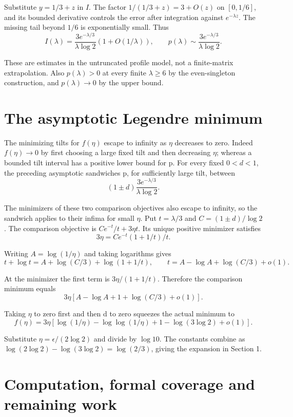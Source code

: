 \documentclass[11pt,letterpaper]{article}
\begin{document}
Substitute $y=1/3+z$ in $I$. The factor $1/(1/3+z)=3+O(z)$ on $[0,1/6]$, and its bounded derivative controls the error after integration against $e^{-\lambda z}$. The missing tail beyond $1/6$ is exponentially small. Thus
\[
I(\lambda)=\frac{3e^{-\lambda/3}}{\lambda\log2}
 (1+O(1/\lambda)),\qquad
p(\lambda)\sim\frac{3e^{-\lambda/3}}{\lambda\log2}.
\]

These are estimates in the untruncated profile model, not a finite-matrix extrapolation. Also $p(\lambda)>0$ at every finite $\lambda\ge6$ by the even-singleton construction, and $p(\lambda)\to0$ by the upper bound.

\section{The asymptotic Legendre minimum}

The minimizing tilts for $f(\eta)$ escape to infinity as $\eta$ decreases to zero. Indeed $f(\eta)\to0$ by first choosing a large fixed tilt and then decreasing $\eta$; whereas a bounded tilt interval has a positive lower bound for p. For every fixed $0<d<1$, the preceding asymptotic sandwiches p, for sufficiently large tilt, between
\[
(1\pm d)\frac{3e^{-\lambda/3}}{\lambda\log2}.
\]

The minimizers of these two comparison objectives also escape to infinity, so the sandwich applies to their infima for small $\eta$. Put $t=\lambda/3$ and $C=(1\pm d)/\log2$. The comparison objective is $Ce^{-t}/t+3\eta t$. Its unique positive minimizer satisfies
\[
3\eta=C e^{-t}(1+1/t)/t.
\]

Writing $A=\log(1/\eta)$ and taking logarithms gives
\[
t+\log t=A+\log(C/3)+\log(1+1/t),\qquad
 t=A-\log A+\log(C/3)+o(1).
\]

At the minimizer the first term is $3\eta/(1+1/t)$. Therefore the comparison minimum equals
\[
3\eta[A-\log A+1+\log(C/3)+o(1)].
\]

Taking $\eta$ to zero first and then d to zero squeezes the actual minimum to
\[
f(\eta)=3\eta\left[\log(1/\eta)-\log\log(1/\eta)
 +1-\log(3\log2)+o(1)\right].
\]

Substitute $\eta=\epsilon/(2\log2)$ and divide by $\log10$. The constants combine as $\log(2\log2)-\log(3\log2)=\log(2/3)$, giving the expansion in Section 1.

\section{Computation, formal coverage and remaining work}
\end{document}
